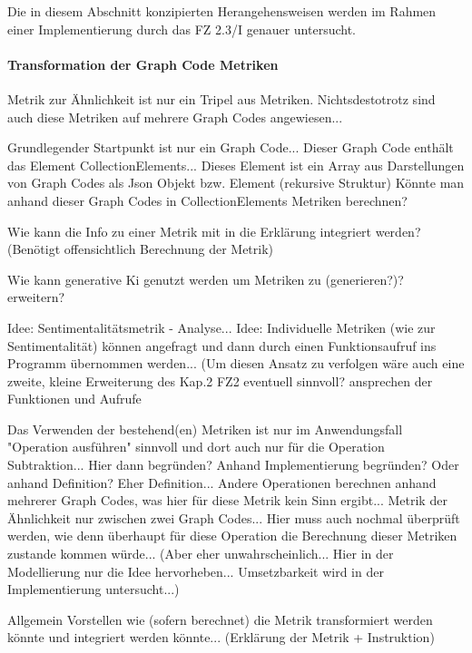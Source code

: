
Die in diesem Abschnitt konzipierten Herangehensweisen werden im Rahmen einer Implementierung durch das FZ 2.3/I genauer untersucht.

\paragraph{Transformation der Graph Code Metriken}

Metrik zur Ähnlichkeit ist nur ein Tripel aus Metriken.
Nichtsdestotrotz sind auch diese Metriken auf mehrere Graph Codes angewiesen...

Grundlegender Startpunkt ist nur ein Graph Code... Dieser Graph Code enthält das Element CollectionElements... Dieses Element ist ein Array aus Darstellungen von Graph Codes als Json Objekt bzw. Element (rekursive Struktur)
Könnte man anhand dieser Graph Codes in CollectionElements Metriken berechnen?

Wie kann die Info zu einer Metrik mit in die Erklärung integriert werden? (Benötigt offensichtlich Berechnung der Metrik)

Wie kann generative Ki genutzt werden um Metriken zu (generieren?)? erweitern?

Idee: Sentimentalitätsmetrik - Analyse...
Idee: Individuelle Metriken (wie zur Sentimentalität) können angefragt und dann durch einen Funktionsaufruf ins Programm übernommen werden... (Um diesen Ansatz zu verfolgen wäre auch eine zweite, kleine Erweiterung des Kap.2 FZ2 eventuell sinnvoll? ansprechen der Funktionen und Aufrufe

Das Verwenden der bestehend(en) Metriken ist nur im Anwendungsfall "Operation ausführen" sinnvoll und dort auch nur für die Operation Subtraktion...
Hier dann begründen? Anhand Implementierung begründen? Oder anhand Definition? Eher Definition...
Andere Operationen berechnen anhand mehrerer Graph Codes, was hier für diese Metrik kein Sinn ergibt... Metrik der Ähnlichkeit nur zwischen zwei Graph Codes...
Hier muss auch nochmal überprüft werden, wie denn überhaupt für diese Operation die Berechnung dieser Metriken zustande kommen würde... (Aber eher unwahrscheinlich... Hier in der Modellierung nur die Idee hervorheben... Umsetzbarkeit wird in der Implementierung untersucht...)

Allgemein Vorstellen wie (sofern berechnet) die Metrik transformiert werden könnte und integriert werden könnte... (Erklärung der Metrik + Instruktion)

